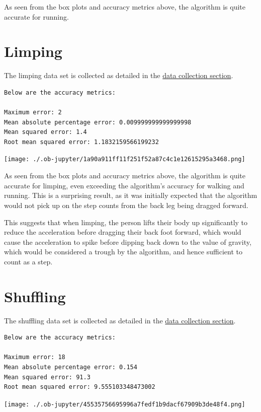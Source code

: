 \documentclass[12pt]{report}
\begin{document}
As seen from the box plots and accuracy metrics above,
the algorithm is quite accurate for running.
\section{Limping}
\label{sec:org26fb283}
The limping data set is collected as detailed in the
\hyperref[orgdcbbb87]{data collection section}.
\label{org91b3808}
\begin{verbatim}
Below are the accuracy metrics:

Maximum error: 2
Mean absolute percentage error: 0.009999999999999998
Mean squared error: 1.4
Root mean squared error: 1.1832159566199232
\end{verbatim}

\begin{center}
\texttt{[image: ./.ob-jupyter/1a90a911ff11f251f52a87c4c1e12615295a3468.png]}
\end{center}

\clearpage

As seen from the box plots and accuracy metrics above,
the algorithm is quite accurate for limping,
even exceeding the algorithm's accuracy for walking and running.
This is a surprising result,
as it was initially expected that the algorithm would not pick up
on the step counts from the back leg being dragged forward.

This suggests that when limping, the person lifts their body up
significantly to reduce the acceleration before dragging their back
foot forward, which would cause the acceleration to spike before
dipping back down to the value of gravity, which would be considered
a trough by the algorithm, and hence sufficient to count as a step.
\section{Shuffling}
\label{sec:org07aefe9}
The shuffling data set is collected as detailed in the
\hyperref[orgdcbbb87]{data collection section}.
\label{org366d03b}
\begin{verbatim}
Below are the accuracy metrics:

Maximum error: 18
Mean absolute percentage error: 0.154
Mean squared error: 91.3
Root mean squared error: 9.555103348473002
\end{verbatim}

\begin{center}
\texttt{[image: ./.ob-jupyter/45535756695996a7fedf1b9dacf67909b3de48f4.png]}
\end{center}
\end{document}
